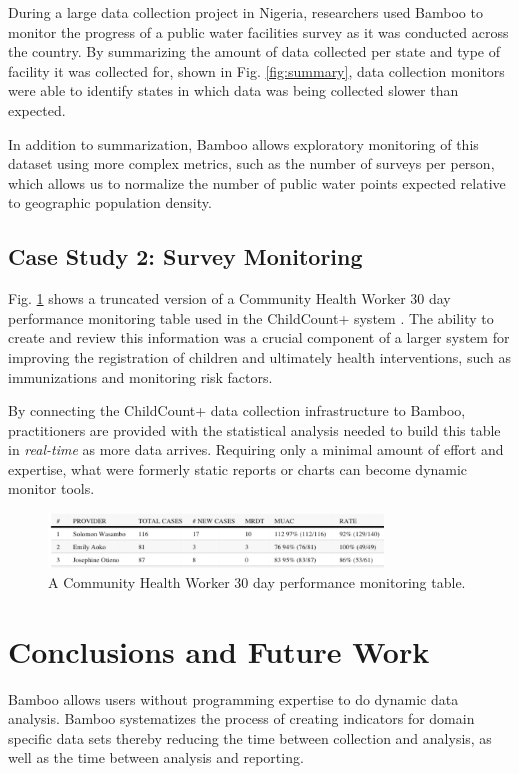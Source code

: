 \documentclass{acm_proc_article-sp}
\begin{document}
During a large data collection project in Nigeria, researchers used Bamboo to monitor the progress of a public water facilities survey as it was conducted across the country. By summarizing the amount of data collected per state and type of facility it was collected for, shown in Fig. \ref{fig:summary}, data collection monitors were able to identify states in which data was being collected slower than expected.

In addition to summarization, Bamboo allows exploratory monitoring of this dataset using more complex metrics, such as the number of surveys per person, which allows us to normalize the number of public water points expected relative to geographic population density.

\subsection{Case Study 2: Survey Monitoring}

Fig. \ref{fig:berg} shows a truncated version of a Community Health Worker 30 day performance monitoring table used in the ChildCount+ system \cite{berg}.  The ability to create and review this information was a crucial component of a larger system for improving the registration of children and ultimately health interventions, such as immunizations and monitoring risk factors.

By connecting the ChildCount+ data collection infrastructure to Bamboo, practitioners are provided with the statistical analysis needed to build this table in \emph{real-time} as more data arrives.  Requiring only a minimal amount of effort and expertise, what were formerly static reports or charts can become dynamic monitor tools.

\begin{figure}
\centering
\includegraphics[width=3.5in]{figures/berg_table}
\caption{A Community Health Worker 30 day performance monitoring table\cite{berg}.}
\label{fig:berg}
\end{figure}

\section{Conclusions and Future Work}
Bamboo allows users without programming expertise to do dynamic data analysis.  Bamboo systematizes the process of creating indicators for domain specific data sets thereby reducing the time between collection and analysis, as well as the time between analysis and reporting.
\end{document}
